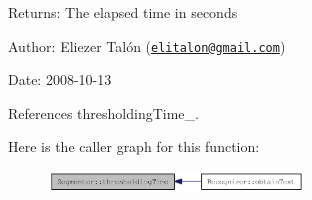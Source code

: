\begin{Desc}
\item[Returns:]The elapsed time in seconds\end{Desc}
\begin{Desc}
\item[Author:]Eliezer Talón (\href{mailto:elitalon@gmail.com}{\tt elitalon@gmail.com}) \end{Desc}
\begin{Desc}
\item[Date:]2008-10-13 \end{Desc}


References thresholdingTime\_\-.

Here is the caller graph for this function:\nopagebreak
\begin{figure}[H]
\begin{center}
\leavevmode
\includegraphics[width=192pt]{class_segmenter_9114d0f3934b43478fb55077b7722d3d_icgraph}
\end{center}
\end{figure}
